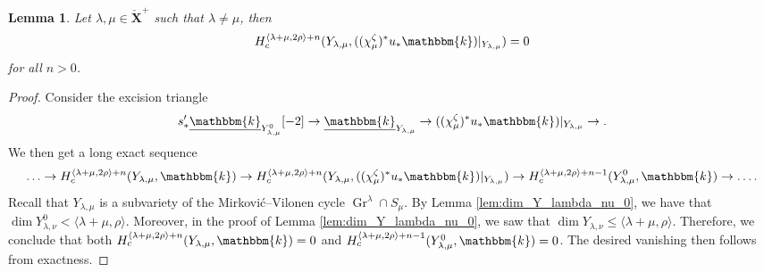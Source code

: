 \documentclass{amsart}
\renewcommand{\k}{\mathbbm{k}}
\newcommand{\bfXv}{\check{\mathbf{X}}}
\newcommand{\uk}{\underline{\k}}
\DeclareMathOperator{\Gr}{Gr}
\newtheorem{lemma}[subsubsection]{Lemma}
\theoremstyle{definition}
\begin{document}
    \begin{lemma}\label{lem:cohom_of_Y_mu_lambda}
        Let $\lambda, \mu \in \bfXv^+$ such that $\lambda \neq \mu$, then
        \[H_c^{\langle \lambda + \mu, 2\rho \rangle + n} (Y_{\lambda, \mu}, ((\chi_{\mu}^{\zeta})^* u_* \k)\vert_{Y_{\lambda, \mu}}) = 0\]
        for all $n > 0$.    
    \end{lemma}
    \begin{proof}
        Consider the excision triangle
        \[s_*' \uk_{Y_{\lambda, \mu}^0} [-2] \to \uk_{Y_{\lambda, \mu}} \to ((\chi_{\mu}^{\zeta})^* u_* \k)\vert_{Y_{\lambda, \mu}} \to.\]
        We then get a long exact sequence
        \[\ldots \to H_c^{\langle \lambda + \mu, 2\rho \rangle + n} (Y_{\lambda, \mu}, \k) \to H_c^{\langle \lambda + \mu, 2\rho \rangle + n} (Y_{\lambda, \mu},  ((\chi_{\mu}^{\zeta})^* u_* \k)\vert_{Y_{\lambda, \mu}}) \to H_c^{\langle \lambda + \mu, 2\rho \rangle + n - 1} (Y_{\lambda, \mu}^0, \k) \to \ldots.\]
        Recall that $Y_{\lambda, \mu}$ is a subvariety of the Mirković--Vilonen cycle $\Gr^{\lambda} \cap S_{\mu}$.
        By Lemma \ref{lem:dim_Y_lambda_nu_0}, we have that $\dim Y_{\lambda, \nu}^0 < \langle \lambda + \mu, \rho \rangle$.
        Moreover, in the proof of Lemma \ref{lem:dim_Y_lambda_nu_0}, we saw that $\dim Y_{\lambda, \nu} \leq \langle \lambda + \mu, \rho \rangle$.
        Therefore, we conclude that both $H_c^{\langle \lambda + \mu, 2\rho \rangle + n} (Y_{\lambda, \mu}, \k) = 0$ and $H_c^{\langle \lambda + \mu, 2\rho \rangle + n - 1} (Y_{\lambda, \mu}^0, \k) = 0$.
        The desired vanishing then follows from exactness.
    \end{proof}
\end{document}
